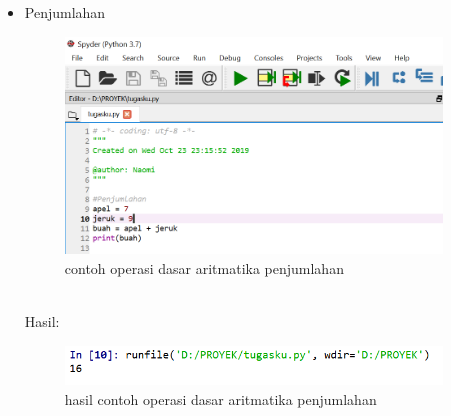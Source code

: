 \begin{enumerate}
\begin{itemize}
\newpage
\item Penjumlahan
\begin{figure}[!htbp]
\centering
\includegraphics[width=10cm]{gambar2/tambah.png}
\caption{contoh operasi dasar aritmatika penjumlahan}
\end{figure}\\
Hasil:
\begin{figure}[!htbp]
\centering
\includegraphics[width=10cm]{gambar2/tmbh1.png}
\caption{hasil contoh operasi dasar aritmatika penjumlahan}
\end{figure}


\end{itemize}
\end{enumerate}
